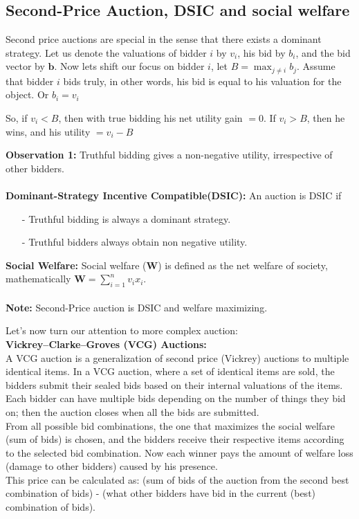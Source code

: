 \documentclass[a4paper]{article}
\begin{document}
\subsection*{Second-Price Auction, DSIC and social welfare}
Second price auctions are special in the sense that there exists a dominant strategy.
Let us denote the valuations of bidder $i$ by $v_i$, his bid by $b_i$, and the bid vector by $\mathbf{b}$. Now lets shift our focus on bidder $i$, let $B = \max_{j\ne i} b_j$. 
Assume that bidder $i$ bids truly, in other words, his bid is equal to his valuation for the object. Or $b_i = v_i$

So, if $v_i < B$, then with true bidding his net utility gain $= 0$. If $v_i > B$, then he wins, and his utility $= v_i - B$

\textbf{Observation 1:} Truthful bidding gives a non-negative utility, irrespective of other bidders.  \\ \\
\textbf{Dominant-Strategy Incentive Compatible(DSIC):} An auction is DSIC if
\begin{itemize}
    \item[-] Truthful bidding is always a dominant strategy.
    \item[-] Truthful bidders always obtain non negative utility.
\end{itemize}
\textbf{Social Welfare:} Social welfare ($\mathbf{W}$) is defined as the net welfare of society, mathematically $\mathbf{W} = \sum_{i=1}^{n}v_i x_i$. \\ \\
\textbf{Note:} Second-Price auction is DSIC and welfare maximizing.


\pagebreak
Let's now turn our attention to more complex auction: \\

\textbf{ Vickrey–Clarke–Groves (VCG) Auctions:}\\

A VCG auction is a generalization of second price (Vickrey) auctions to multiple identical items. In a VCG auction, where a set of identical items are sold, the bidders submit their sealed bids based on their internal valuations of the items. Each bidder can have multiple bids depending on the number of things they bid on; then the auction closes when all the bids are submitted.
\\
From all possible bid combinations, the one that maximizes the social welfare (sum of bids) is chosen, and the bidders receive their respective items according to the selected bid combination. Now each winner pays the amount of welfare loss (damage to other bidders) caused by his presence.
\\
This price can be calculated as: (sum of bids of the auction from the second best combination of bids) - (what other bidders have bid in the current (best) combination of bids).
\end{document}

